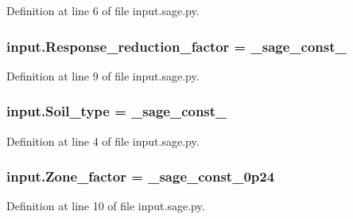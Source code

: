 Definition at line 6 of file input.\+sage.\+py.

\hypertarget{namespaceinput_aa6d0078a6d934c0d515d85059525e938}{}
\subsubsection[{Response\+\_\+reduction\+\_\+factor}]{\setlength{\rightskip}{0pt plus 5cm}input.\+Response\+\_\+reduction\+\_\+factor = \+\_\+sage\+\_\+const\+\_}\label{namespaceinput_aa6d0078a6d934c0d515d85059525e938}


Definition at line 9 of file input.\+sage.\+py.

\hypertarget{namespaceinput_a6221ae01cf2fb9e8cd22204749785a0e}{}
\subsubsection[{Soil\+\_\+type}]{\setlength{\rightskip}{0pt plus 5cm}input.\+Soil\+\_\+type = \+\_\+sage\+\_\+const\+\_}\label{namespaceinput_a6221ae01cf2fb9e8cd22204749785a0e}


Definition at line 4 of file input.\+sage.\+py.

\hypertarget{namespaceinput_aeea70e58ec9bb0d3d6c4363867eb0f82}{}
\subsubsection[{Zone\+\_\+factor}]{\setlength{\rightskip}{0pt plus 5cm}input.\+Zone\+\_\+factor = \+\_\+sage\+\_\+const\+\_\+0p24}\label{namespaceinput_aeea70e58ec9bb0d3d6c4363867eb0f82}


Definition at line 10 of file input.\+sage.\+py.

